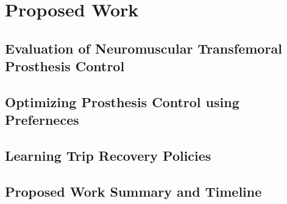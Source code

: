\chapter{Proposed Work}

\section{Evaluation of Neuromuscular Transfemoral Prosthesis Control}

\section{Optimizing Prosthesis Control using Preferneces}

\section{Learning Trip Recovery Policies}
\label{sec:proposed_trip_recovery}

\section{Proposed Work Summary and Timeline}
